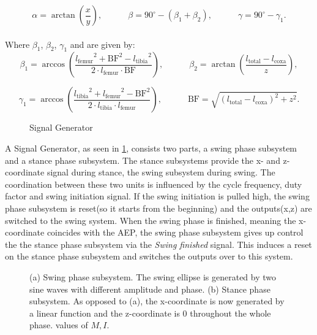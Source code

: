 \[
	\alpha = \arctan(\frac{x}{y}) ,\quad \quad \quad \beta = 90^{\circ} - (\beta_1 + \beta_2) ,\quad \quad \quad \gamma = 90^{\circ} - \gamma_1.
\]
\\
Where $\beta_1$, $\beta_2$, $\gamma_1$ and  are given by:
\[	
	\beta_1 = \arccos(\frac{{l_\text{femur}}^2 + \text{BF}^2 - {l_\text{tibia}}^2}  {2\cdot l_\text{femur} \cdot \text{BF}}) ,\quad \quad \quad \beta_2 = \arctan(\frac{ l_\text{total} - l_\text{coxa}} {z}),
\]

\[
	\gamma_1 = \arccos(\frac{{l_\text{tibia}}^2 + {l_\text{femur}}^2 - {\text{BF}}^2}  {2 \cdot {l_\text{tibia}} \cdot {l_\text{femur}}}) ,\quad \quad \quad \text{BF} = \sqrt{(l_\text{total} - l_\text{coxa})^2 + z^2}.
\]








\begin{figure}[h]
	\centerline{}
	\caption{Signal Generator}
	\label{figure: Signal Generator}
\end{figure}

A Signal Generator, as seen in \ref{figure: Signal Generator}, consists two parts, a swing phase subsystem and a stance phase subsystem.
The stance subsystems provide the x- and z-coordinate signal during stance, the swing subsystem during swing.
The coordination between these two units is influenced by the cycle frequency, duty factor and swing initiation signal.
If the swing initiation is pulled high, the swing phase subsystem is reset(so it starts from the beginning) and the outputs(x,z) are switched to the swing system.
When the swing phase is finished, meaning the x-coordinate coincides with the AEP, the swing phase subsystem gives up control the the stance phase subsystem via the \textit{Swing finished} signal.
This induces a reset on the stance phase subsystem and switches the outputs over to this system.

\begin{figure}
	\centering
	\begin{subfigure}[b]{0.55\textwidth}
		
		\caption{}
		\label{fig:Ng1} 
	\end{subfigure}
	
	\begin{subfigure}[b]{0.55\textwidth}
		
		\caption{}
		\label{fig:Ng2}
	\end{subfigure}
	
	\caption[Swing and Stance Phase]{(a) Swing phase subsystem. The swing ellipse is generated by two sine waves with different amplitude and phase. (b) Stance phase subsystem. As opposed to (a), the x-coordinate is now generated by a linear function and the z-coordinate is 0 throughout the whole phase.
		values of $M,I$.}
\end{figure}




